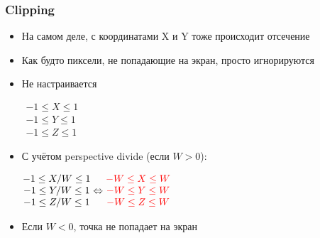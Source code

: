 \documentclass{beamer}
\begin{document}
\begin{frame}[fragile]
\frametitle{Clipping}
\begin{itemize}
\item На самом деле, с координатами X и Y тоже происходит отсечение
\pause
\item Как будто пиксели, не попадающие на экран, просто игнорируются
\pause
\item Не настраивается
\pause

\begin{center}
\begin{math}
\begin{matrix}
-1 \leq X \leq 1 \\
-1 \leq Y \leq 1 \\
-1 \leq Z \leq 1
\end{matrix}
\end{math}
\end{center}

\pause
\item С учётом perspective divide (если \begin{math}W>0\end{math}):

\begin{center}
\begin{math}
\begin{matrix}
-1 \leq X/W \leq 1 \\
-1 \leq Y/W \leq 1 \\
-1 \leq Z/W \leq 1
\end{matrix}
\Leftrightarrow
\color{red}
\begin{matrix}
-W \leq X \leq W \\
-W \leq Y \leq W \\
-W \leq Z \leq W
\end{matrix}
\end{math}
\end{center}

\pause
\item Если \begin{math}W<0\end{math}, точка не попадает на экран
\end{itemize}

\end{frame}
\end{document}
